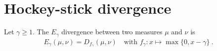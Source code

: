 \section{Hockey-stick divergence}

\begin{definition}
  \label{def:eGamma}
  Let $\gamma \ge 1$. The $E_\gamma$ divergence between two measures $\mu$ and $\nu$ is
  \begin{align*}
  E_\gamma(\mu, \nu) = D_{f_\gamma}(\mu, \nu) \quad \text{with } f_\gamma: x \mapsto \max\{0, x - \gamma\} \: .
  \end{align*}
\end{definition}